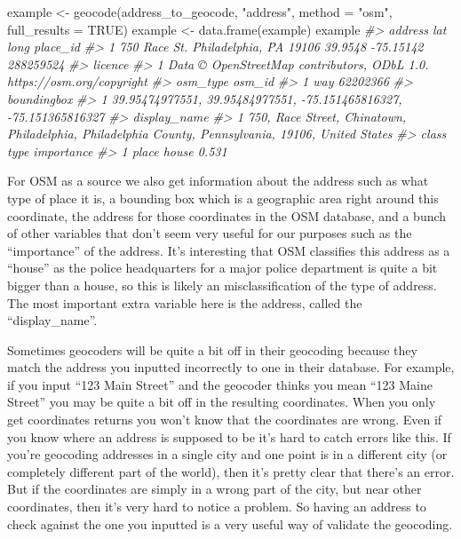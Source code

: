 \documentclass[
]{krantz}
\makeatletter
\newenvironment{Shaded}{\begin{snugshade}}{\end{snugshade}}
\newcommand{\AttributeTok}[1]{\textcolor[rgb]{0.61,0.61,0.61}{#1}}
\newcommand{\CommentTok}[1]{\textcolor[rgb]{0.37,0.37,0.37}{\textit{#1}}}
\newcommand{\ConstantTok}[1]{\textcolor[rgb]{0,0,0}{#1}}
\newcommand{\FunctionTok}[1]{\textcolor[rgb]{0,0,0}{#1}}
\newcommand{\NormalTok}[1]{#1}
\newcommand{\OtherTok}[1]{\textcolor[rgb]{0.37,0.37,0.37}{#1}}
\newcommand{\StringTok}[1]{\textcolor[rgb]{0.5,0.5,0.5}{#1}}
\newenvironment{kframe}{%
\medskip{}
\setlength{\fboxsep}{.8em}
 \def\at@end@of@kframe{}%
 \ifinner\ifhmode%
  \def\at@end@of@kframe{\end{minipage}}%
  \begin{minipage}{\columnwidth}%
 \fi\fi%
 \def\FrameCommand##1{\hskip\@totalleftmargin \hskip-\fboxsep
 \colorbox{shadecolor}{##1}\hskip-\fboxsep
     \hskip-\linewidth \hskip-\@totalleftmargin \hskip\columnwidth}%
 \MakeFramed {\advance\hsize-\width
   \@totalleftmargin\z@ \linewidth\hsize
   \@setminipage}}%
 {\par\unskip\endMakeFramed%
 \at@end@of@kframe}
\renewenvironment{Shaded}{\begin{kframe}}{\end{kframe}}
\makeatother
\begin{document}
\begin{Shaded}
\begin{Highlighting}[]
\NormalTok{example }\OtherTok{\textless{}{-}} \FunctionTok{geocode}\NormalTok{(address\_to\_geocode, }\StringTok{"address"}\NormalTok{,}
                   \AttributeTok{method =} \StringTok{"osm"}\NormalTok{, }\AttributeTok{full\_results =} \ConstantTok{TRUE}\NormalTok{)}
\NormalTok{example }\OtherTok{\textless{}{-}} \FunctionTok{data.frame}\NormalTok{(example)}
\NormalTok{example}
\CommentTok{\#\textgreater{}                               address     lat      long  place\_id}
\CommentTok{\#\textgreater{} 1 750 Race St. Philadelphia, PA 19106 39.9548 {-}75.15142 288259524}
\CommentTok{\#\textgreater{}                                                                  licence}
\CommentTok{\#\textgreater{} 1 Data © OpenStreetMap contributors, ODbL 1.0. https://osm.org/copyright}
\CommentTok{\#\textgreater{}   osm\_type   osm\_id}
\CommentTok{\#\textgreater{} 1      way 62202366}
\CommentTok{\#\textgreater{}                                                          boundingbox}
\CommentTok{\#\textgreater{} 1 39.95474977551, 39.95484977551, {-}75.151465816327, {-}75.151365816327}
\CommentTok{\#\textgreater{}                                                                                         display\_name}
\CommentTok{\#\textgreater{} 1 750, Race Street, Chinatown, Philadelphia, Philadelphia County, Pennsylvania, 19106, United States}
\CommentTok{\#\textgreater{}   class  type importance}
\CommentTok{\#\textgreater{} 1 place house      0.531}
\end{Highlighting}
\end{Shaded}

For OSM as a source we also get information about the address such as what type of place it is, a bounding box which is a geographic area right around this coordinate, the address for those coordinates in the OSM database, and a bunch of other variables that don't seem very useful for our purposes such as the ``importance'' of the address. It's interesting that OSM classifies this address as a ``house'' as the police headquarters for a major police department is quite a bit bigger than a house, so this is likely an misclassification of the type of address. The most important extra variable here is the address, called the ``display\_name''.

Sometimes geocoders will be quite a bit off in their geocoding because they match the address you inputted incorrectly to one in their database. For example, if you input ``123 Main Street'' and the geocoder thinks you mean ``123 Maine Street'' you may be quite a bit off in the resulting coordinates. When you only get coordinates returns you won't know that the coordinates are wrong. Even if you know where an address is supposed to be it's hard to catch errors like this. If you're geocoding addresses in a single city and one point is in a different city (or completely different part of the world), then it's pretty clear that there's an error. But if the coordinates are simply in a wrong part of the city, but near other coordinates, then it's very hard to notice a problem. So having an address to check against the one you inputted is a very useful way of validate the geocoding.
\end{document}
